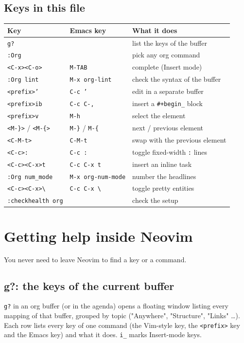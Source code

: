 \subsection{Keys in this file}
\label{sec:org10c0f82}
\begin{center}
\begin{tabular}{lll}
Key & Emacs key & What it does\\
\hline
\texttt{g?} &  & list the keys of the buffer\\
\texttt{:Org} &  & pick any org command\\
\texttt{<C-x><C-o>} & \texttt{M-TAB} & complete (Insert mode)\\
\texttt{:Org lint} & \texttt{M-x org-lint} & check the syntax of the buffer\\
\texttt{<prefix>'} & \texttt{C-c '} & edit in a separate buffer\\
\texttt{<prefix>ib} & \texttt{C-c C-,} & insert a \texttt{\#+begin\_} block\\
\texttt{<prefix>v} & \texttt{M-h} & select the element\\
\texttt{<M-\}>} / \texttt{<M-\{>} & \texttt{M-\}} / \texttt{M-\{} & next / previous element\\
\texttt{<C-M-t>} & \texttt{C-M-t} & swap with the previous element\\
\texttt{<C-c>:} & \texttt{C-c :} & toggle fixed-width \texttt{:} lines\\
\texttt{<C-c><C-x>t} & \texttt{C-c C-x t} & insert an inline task\\
\texttt{:Org num\_mode} & \texttt{M-x org-num-mode} & number the headlines\\
\texttt{<C-c><C-x>\textbackslash{}} & \texttt{C-c C-x \textbackslash{}} & toggle pretty entities\\
\texttt{:checkhealth org} &  & check the setup\\
\end{tabular}
\end{center}
\section{Getting help inside Neovim}
\label{sec:org99371d7}
You never need to leave Neovim to find a key or a command.
\subsection{g?: the keys of the current buffer}
\label{sec:org9627784}
\texttt{g?} in an org buffer (or in the agenda) opens a floating window listing
every mapping of that buffer, grouped by topic ("Anywhere", "Structure",
"Links" \ldots{}). Each row lists every key of one command (the Vim-style key,
the \texttt{<prefix>} key and the Emacs key) and what it does. \texttt{i\_} marks
Insert-mode keys.

